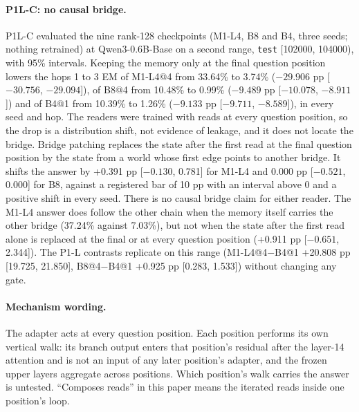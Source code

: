 \paragraph{P1L-C: no causal bridge.}
P1L-C evaluated the nine rank-128 checkpoints (M1-L4, B8 and B4, three seeds; nothing retrained) at Qwen3-0.6B-Base on a second range, \texttt{test} [102000, 104000), with 95\% intervals.
Keeping the memory only at the final question position lowers the hops 1 to 3 EM of M1-L4@4 from 33.64\% to 3.74\% ($-29.906$ pp [$-30.756$, $-29.094$]), of B8@4 from 10.48\% to 0.99\% ($-9.489$ pp [$-10.078$, $-8.911$]) and of B4@1 from 10.39\% to 1.26\% ($-9.133$ pp [$-9.711$, $-8.589$]), in every seed and hop.
The readers were trained with reads at every question position, so the drop is a distribution shift, not evidence of leakage, and it does not locate the bridge.  %
Bridge patching replaces the state after the first read at the final question position by the state from a world whose first edge points to another bridge.
It shifts the answer by +0.391 pp [$-0.130$, 0.781] for M1-L4 and 0.000 pp [$-0.521$, 0.000] for B8, against a registered bar of 10 pp with an interval above 0 and a positive shift in every seed.  %
There is no causal bridge claim for either reader.
The M1-L4 answer does follow the other chain when the memory itself carries the other bridge (37.24\% against 7.03\%), but not when the state after the first read alone is replaced at the final or at every question position (+0.911 pp [$-0.651$, 2.344]).  %
The P1-L contrasts replicate on this range (M1-L4@4$-$B4@1 +20.808 pp [19.725, 21.850], B8@4$-$B4@1 +0.925 pp [0.283, 1.533]) without changing any gate.  %

\paragraph{Mechanism wording.}
The adapter acts at every question position.
Each position performs its own vertical walk: its branch output enters that position's residual after the layer-14 attention and is not an input of any later position's adapter, and the frozen upper layers aggregate across positions.
Which position's walk carries the answer is untested.
``Composes reads'' in this paper means the iterated reads inside one position's loop.  %

